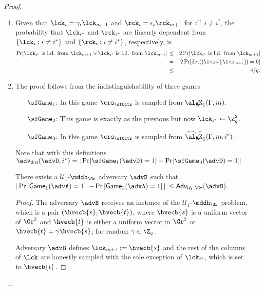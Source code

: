 \begin{proof}
\begin{enumerate}[label=(\roman*)]
\item Given that $\lck_i=\gamma_i\lck_{m+1}$ and $\rck_i=\epsilon_i\rck_{m+1}$ for all $i\neq i^*$, the probability that $\lck_{i^*}$ and $\rck_{i^*}$ are linearly dependent from $\{\lck_i:i\neq i^*\}$ and $\{\rck_i:i\neq i^*\}$, respectively, is
\begin{eqnarray*}
\Pr[\lck_{i^*}\text{ is l.d. from }\lck_{m+1}\vee\lck_{i^*}\text{ is l.d. from }\lck_{m+1}] & \leq & 2\Pr[\lck_{i^*}\text{ is l.d. from }\lck_{m+1}]\\
& = & 2\Pr[\det((\lck_{i^*}||\lck_{m+1}))=0]\\
& \leq & 4/q.
\end{eqnarray*}

\item The proof follows from the indistinguishability of three games
\begin{itemize}
\item[$\sfGame_1$:] In this game $\crs_\sfbits$ is sampled from $\algK_1(\Gamma,m)$.
\item[$\sfGame_2$:] This game is exactly as the previous but now $\lck_{i^*}\gets\Z_q^2$.
\item[$\sfGame_3$:] In this game $\crs_\sfbits$ is sampled from $\widetilde{\algK}_1(\Gamma,m,i^*)$.
\end{itemize}
Note that with this definitions $\adv_{\mathsf{dist}}(\advD,i^*)=|\Pr[\sfGame_1(\advD)=1]-\Pr[\sfGame_3(\advD)=1]|$

\begin{lemma} There exists a $\mathcal{U}_1$-$\mddh_\Gr$ adversary $\advB$ such that
$|\Pr\left[\mathsf{Game}_{1}(\advA)=1\right]$ $-\Pr\left[\mathsf{Game}_{2}(\advA)=1\right]|$ $\leq
    \mathsf{Adv}_{\mathcal{U}_1,\Gr}(\advB).$
\label{lemma:bits2}
\end{lemma}
\begin{proof}
The adversary $\advB$ receives an instance of the $\mathcal{U}_1$-$\mddh_\Gr$ problem, which is a pair
$(\hvecb{s}, \hvecb{t})$, where $\hvecb{s}$ is a uniform vector 
of $\Gr^{2}$ and $\hvecb{t}$ is either a uniform vector in $\Gr^2$ or 
$\hvecb{t}=\gamma\hvecb{s}$, for random $\gamma\in\Z_q$.
 
Adversary $\advB$ defines
$\lck_{m+1}:= \hvecb{s}$ and the rest of the columns of $\Lck$ are honestly sampled
with the sole exception of $\lck_{i^*}$, which is set to $\hvecb{t}$.


\end{proof}
\end{enumerate}
\end{proof}
